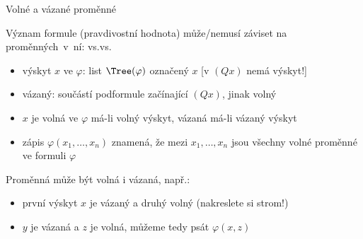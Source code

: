 \documentclass{beamer}
\begin{document}
\begin{frame}{Volné a vázané proměnné}

    Význam formule (\alert{pravdivostní hodnota}) může/nemusí záviset na proměnných~v~ní: \pause {}vs.vs.

    \pause 
    \begin{itemize}
        \item \alert{výskyt $x$ ve $\varphi$:} list $\Tree(\varphi)$ označený $x$ [v $(Qx)$ nemá výskyt!] \pause 
        \item \alert{vázaný}: součástí podformule začínající $(Qx)$, jinak \alert{volný} \pause 
        \item $x$ je \alert{volná} ve $\varphi$ má-li volný výskyt, \alert{vázaná} má-li vázaný výskyt \pause 
        \item zápis \alert{$\varphi(x_1,\dots,x_n)$} znamená, že mezi $x_1,\dots,x_n$ jsou všechny volné proměnné ve formuli $\varphi$ \pause 
    \end{itemize}

    Proměnná může být \alert{volná i vázaná}, např.:
     \pause 

    \begin{itemize}
        \item první výskyt $x$ je vázaný a druhý volný (nakreslete si strom!)  \pause 
        \item $y$ je vázaná a $z$ je volná, můžeme tedy psát $\varphi(x,z)$
    \end{itemize}

\end{frame}
\end{document}
